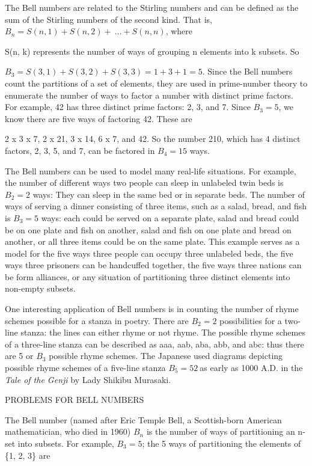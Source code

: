 \documentclass[10pt,letter]{article}
\begin{document}
The Bell numbers are related to the Stirling numbers and can be defined
as the sum of the Stirling numbers of the second kind. That is,
\(B_{n} = S\left( n,1 \right) + S\left( n,2 \right) + \ \ldots + S(n,n)\),
where

S(n, k) represents the number of ways of grouping n elements into k
subsets. So

\(B_{3} = S\left( 3,1 \right) + S\left( 3,2 \right) + S\left( 3,3 \right) = 1 + 3 + 1 = 5.\)
Since the Bell numbers count the partitions of a set of elements, they
are used in prime-number theory to enumerate the number of ways to
factor a number with distinct prime factors. For example, 42 has three
distinct prime factors: 2, 3, and 7. Since \(B_{3} = 5\), we know there
are five ways of factoring 42. These are

2 x 3 x 7, 2 x 21, 3 x 14, 6 x 7, and 42. So the number 210, which has 4
distinct factors, 2, 3, 5, and 7, can be factored in \(B_{4} = 15\)
ways.

The Bell numbers can be used to model many real-life situations. For
example, the number of different ways two people can sleep in unlabeled
twin beds is \(B_{2} = 2\) ways: They can sleep in the same bed or in
separate beds. The number of ways of serving a dinner consisting of
three items, such as a salad, bread, and fish is \(B_{3} = 5\) ways:
each could be served on a separate plate, salad and bread could be on
one plate and fish on another, salad and fish on one plate and bread on
another, or all three items could be on the same plate. This example
serves as a model for the five ways three people can occupy three
unlabeled beds, the five ways three prisoners can be handcuffed
together, the five ways three nations can be form alliances, or any
situation of partitioning three distinct elements into non-empty
subsets.

One interesting application of Bell numbers is in counting the number of
rhyme schemes possible for a stanza in poetry. There are \(B_{2} = 2\)
possibilities for a two-line stanza: the lines can either rhyme or not
rhyme. The possible rhyme schemes of a three-line stanza can be
described as aaa, aab, aba, abb, and abc: thus there are 5 or \(B_{3}\)
possible rhyme schemes. The Japanese used diagrams depicting possible
rhyme schemes of a five-line stanza \(B_{5} = 52\ \)as early as 1000
A.D. in the \emph{Tale of the Genji} by Lady Shikibu Murasaki.

PROBLEMS FOR BELL NUMBERS

The Bell number (named after Eric Temple Bell, a Scottish-born American
mathematician, who died in 1960) \(B_{n}\) is the number of ways of
partitioning an n-set into subsets. For example, \(B_{3} = 5\); the 5
ways of partitioning the elements of \{1, 2, 3\} are
\end{document}
